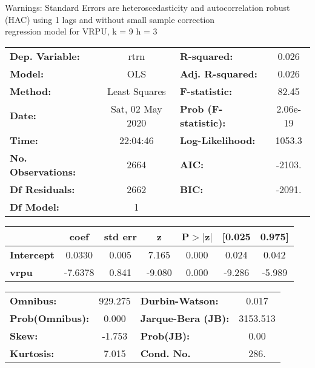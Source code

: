 Warnings: \newline
 [1] Standard Errors are heteroscedasticity and autocorrelation robust (HAC) using 1 lags and without small sample correction\\ 

regression model for VRPU, k = 9 h = 3\begin{center}
\begin{tabular}{lclc}
\toprule
\textbf{Dep. Variable:}    &       rtrn       & \textbf{  R-squared:         } &     0.026   \\
\textbf{Model:}            &       OLS        & \textbf{  Adj. R-squared:    } &     0.026   \\
\textbf{Method:}           &  Least Squares   & \textbf{  F-statistic:       } &     82.45   \\
\textbf{Date:}             & Sat, 02 May 2020 & \textbf{  Prob (F-statistic):} &  2.06e-19   \\
\textbf{Time:}             &     22:04:46     & \textbf{  Log-Likelihood:    } &    1053.3   \\
\textbf{No. Observations:} &        2664      & \textbf{  AIC:               } &    -2103.   \\
\textbf{Df Residuals:}     &        2662      & \textbf{  BIC:               } &    -2091.   \\
\textbf{Df Model:}         &           1      & \textbf{                     } &             \\
\bottomrule
\end{tabular}
\begin{tabular}{lcccccc}
                   & \textbf{coef} & \textbf{std err} & \textbf{z} & \textbf{P$> |$z$|$} & \textbf{[0.025} & \textbf{0.975]}  \\
\midrule
\textbf{Intercept} &       0.0330  &        0.005     &     7.165  &         0.000        &        0.024    &        0.042     \\
\textbf{vrpu}      &      -7.6378  &        0.841     &    -9.080  &         0.000        &       -9.286    &       -5.989     \\
\bottomrule
\end{tabular}
\begin{tabular}{lclc}
\textbf{Omnibus:}       & 929.275 & \textbf{  Durbin-Watson:     } &    0.017  \\
\textbf{Prob(Omnibus):} &   0.000 & \textbf{  Jarque-Bera (JB):  } & 3153.513  \\
\textbf{Skew:}          &  -1.753 & \textbf{  Prob(JB):          } &     0.00  \\
\textbf{Kurtosis:}      &   7.015 & \textbf{  Cond. No.          } &     286.  \\
\bottomrule
\end{tabular}
\end{center}

